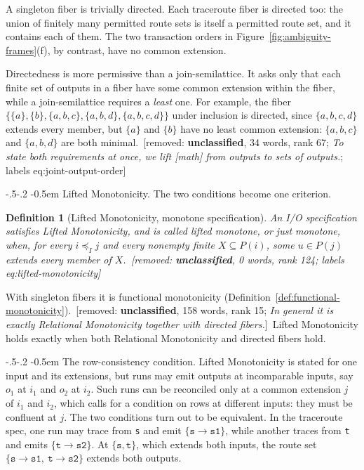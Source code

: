 \documentclass[sigconf]{cidr-2027}
\makeatletter
\newtheorem{definition}{Definition}
\theoremstyle{remark}
\renewcommand\paragraph{\@startsection{paragraph}{4}{\z@}%
  {-.5\baselineskip \@plus -2\p@ \@minus -.2\p@}%
  {-0.5em}%
  {\normalfont\bfseries}}
\newcommand{\InputOrd}{\preceq_I}
\newcommand{\inrel}{extends\xspace}          %
\newcommand{\outrel}{extends\xspace}          %
\newcommand{\spectype}[1][]{I/O specification#1\xspace}
\newcommand{\fiber}[1]{P(#1)}
\newcommand{\removednote}[1]{{\color{cutred}\footnotesize\,[removed: #1]\,}}
\makeatother
\begin{document}
A singleton fiber is trivially directed. \textcolor{newblue}{Each traceroute fiber is directed
too: the union of finitely many permitted route sets is itself a permitted
route set, and it contains each of them.} \textcolor{newblue}{The two transaction orders in
Figure~\ref{fig:ambiguity-frames}(f), by contrast, have no common extension.}

Directedness is more permissive than a join-semilattice. \textcolor{newblue}{It asks only that
each finite set of outputs in a fiber have some common extension within the
fiber, while a join-semilattice requires a \emph{least} one.} For example, the fiber
$\{\{a\},\{b\},\{a,b,c\},\{a,b,d\},\{a,b,c,d\}\}$ under inclusion is directed,
since $\{a,b,c,d\}$ \outrel every member, but $\{a\}$ and $\{b\}$ have no least common extension: $\{a,b,c\}$ and $\{a,b,d\}$ are both minimal. \removednote{\textbf{unclassified}, 34 words, rank 67; \textit{To state both requirements at once, we lift [math] from outputs to sets of outputs.}; labels eq:joint-output-order}

\paragraph{Lifted Monotonicity.}
\textcolor{newblue}{The two conditions become one
criterion.}
\begin{definition}[Lifted Monotonicity, monotone specification]
\label{def:lifted-monotonicity}
\textcolor{newblue}{An \spectype satisfies \emph{Lifted Monotonicity}, and is called
\emph{lifted monotone}, or just \emph{monotone}, when, for every $i\InputOrd j$ and every nonempty finite
$X\subseteq\fiber{i}$, some $u\in\fiber{j}$ \outrel every member of $X$.} \removednote{\textbf{unclassified}, 0 words, rank 124; labels eq:lifted-monotonicity}
\end{definition}

\textcolor{newblue}{With singleton fibers it is functional monotonicity
(Definition~\ref{def:functional-monotonicity}).} \removednote{\textbf{unclassified}, 158 words, rank 15; \textit{In general it is exactly Relational Monotonicity together with directed fibers.}} \textcolor{newblue}{Lifted
Monotonicity holds exactly when both Relational Monotonicity and directed fibers
hold.}

\paragraph{The row-consistency condition.}
Lifted Monotonicity is stated for one input and its extensions, but runs may
emit outputs at incomparable inputs, say $o_1$ at $i_1$ and $o_2$ at $i_2$. Such runs can be reconciled only at a common extension $j$ of $i_1$ and $i_2$, which calls
for a condition on rows at different inputs: they must be confluent at $j$. The two conditions turn out to be equivalent. \textcolor{newblue}{In the traceroute spec, one run may trace from \texttt{s} and emit
$\{\texttt{s}{\to}\texttt{s1}\}$, while another traces from \texttt{t} and
emits $\{\texttt{t}{\to}\texttt{s2}\}$.} At $\{\texttt{s},\texttt{t}\}$, which \inrel both inputs, the route set $\{\texttt{s}{\to}\texttt{s1},\ \texttt{t}{\to}\texttt{s2}\}$ \outrel both outputs.
\end{document}
